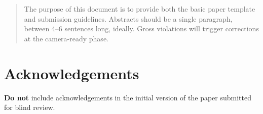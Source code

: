 \documentclass{article}
\begin{document}
\printAffiliationsAndNotice{}  %

\begin{abstract}
The purpose of this document is to provide both the basic paper template and
submission guidelines. Abstracts should be a single paragraph, between 4--6 sentences long, ideally.  Gross violations will trigger corrections at the camera-ready phase.
\end{abstract}










\section*{Acknowledgements}

\textbf{Do not} include acknowledgements in the initial version of
the paper submitted for blind review.





\end{document}
